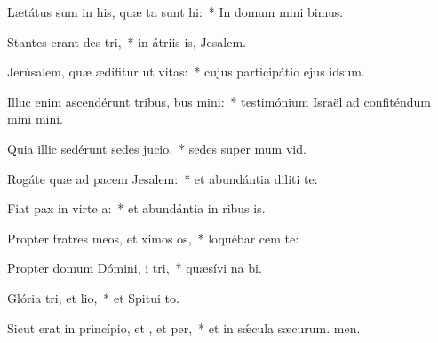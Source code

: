 \item Lætátus sum in his, quæ ta sunt hi:~* In domum mini bimus.
\item Stantes erant des tri,~* in átriis is, Jesalem.
\item Jerúsalem, quæ ædifitur ut vitas:~* cujus participátio ejus  idsum.
\item Illuc enim ascendérunt tribus, bus mini:~* testimónium Israël ad confiténdum mini mini.
\item Quia illic sedérunt sedes  jucio,~* sedes super mum vid.
\item Rogáte quæ ad pacem  Jesalem:~* et abundántia diliti te:
\item Fiat pax in virte a:~* et abundántia in ribus is.
\item Propter fratres meos, et ximos os,~* loquébar cem  te:
\item Propter domum Dómini, i tri,~* quæsívi na bi.
\item Glória tri, et lio,~* et Spitui to.
\item Sicut erat in princípio, et , et per,~* et in sǽcula sæcurum. men.
